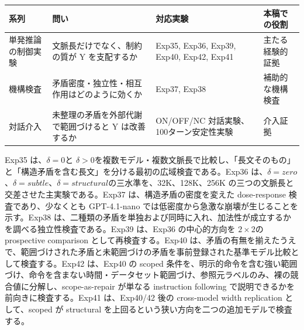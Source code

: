 \documentclass[12pt,a4paper]{article}
\begin{document}
{\def\LTcaptype{table} %
\begin{longtable}[]{@{}
  >{\raggedright\arraybackslash}p{}
  >{\raggedright\arraybackslash}p{}
  >{\raggedright\arraybackslash}p{}
  >{\raggedright\arraybackslash}p{}@{}}
\toprule\noalign{}
\begin{minipage}[b]{\linewidth}\raggedright
系列
\end{minipage} & \begin{minipage}[b]{\linewidth}\raggedright
問い
\end{minipage} & \begin{minipage}[b]{\linewidth}\raggedright
対応実験
\end{minipage} & \begin{minipage}[b]{\linewidth}\raggedright
本稿での役割
\end{minipage} \\
\midrule\noalign{}
\endhead
\bottomrule\noalign{}
\endlastfoot
単発推論の制御実験 & 文脈長だけでなく、制約の質が Y を支配するか & Exp35, Exp36, Exp39, Exp40, Exp42, Exp41 & 主たる経験的証拠 \\
機構検査 & 矛盾密度・独立性・相互作用はどのように効くか & Exp37, Exp38 & 補助的な機構検査 \\
対話介入 & 未整理の矛盾を外部代謝で範囲づけると Y は改善するか & ON/OFF/NC 対話実験、100ターン安定性実験 & 介入証拠 \\
\end{longtable}
}

Exp35 は、\(\delta=0\)と \(\delta>0\)を複数モデル・複数文脈長で比較し、「長文そのもの」と「構造矛盾を含む長文」を分ける最初の広域検査である。Exp36 は、\(\delta=zero\)、\(\delta=subtle\)、\(\delta=structural\)の三水準を、32K、128K、256K の三つの文脈長と交差させた主実験である。Exp37 は、構造矛盾の密度を変えた dose-response 検査であり、少なくとも GPT-4.1-nano では低密度から急激な崩壊が生じることを示す。Exp38 は、二種類の矛盾を単独および同時に入れ、加法性が成立するかを調べる独立性検査である。Exp39 は、Exp36 の中心的方向を \(2\times2\)の prospective comparison として再検査する。Exp40 は、矛盾の有無を揃えたうえで、範囲づけされた矛盾と未範囲づけの矛盾を事前登録された基準モデル比較として検査する。Exp42 は、Exp40 の scoped 条件を、明示的命令を含む強い範囲づけ、命令を含まない時間・データセット範囲づけ、参照元ラベルのみ、裸の競合値に分解し、scope-as-repair が単なる instruction following で説明できるかを前向きに検査する。Exp41 は、Exp40/42 後の cross-model width replication として、scoped が structural を上回るという狭い方向を二つの追加モデルで検査する。
\end{document}
